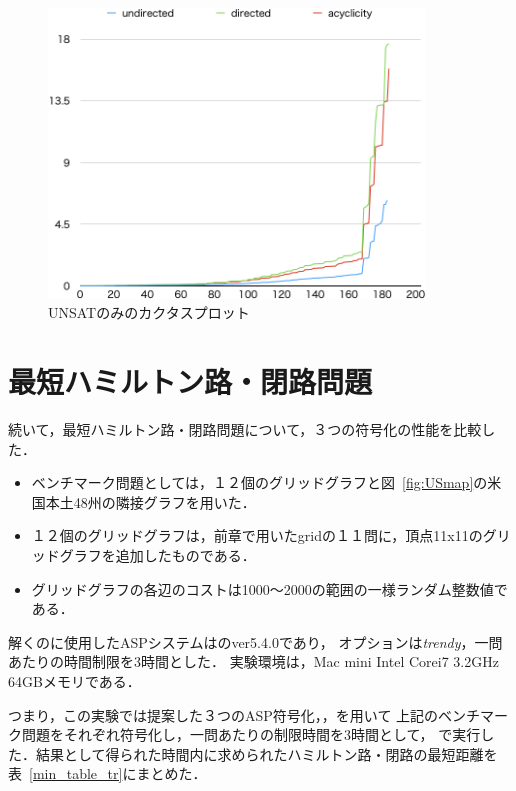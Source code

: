\begin{figure}[htbp]
\begin{center}
  \includegraphics[width=10cm]{fig/cactusunsat.png}
\caption{UNSATのみのカクタスプロット}
\label{cactusunsat}
\end{center}
\end{figure}
\newpage
\section{最短ハミルトン路・閉路問題}
続いて，最短ハミルトン路・閉路問題について，３つの符号化の性能を比較した．

\begin{itemize}
\item ベンチマーク問題としては，１２個のグリッドグラフと図~\ref{fig:USmap}の米国本土48州の隣接グラフを用いた．
\item １２個のグリッドグラフは，前章で用いたgridの１１問に，頂点11x11のグリッドグラフを追加したものである．
\item グリッドグラフの各辺のコストは1000〜2000の範囲の一様ランダム整数値である．
\end{itemize}

解くのに使用したASPシステムは{\clingo}のver5.4.0であり，
オプションは\textit{trendy}，一問あたりの時間制限を3時間とした．
実験環境は，Mac mini Intel Corei7 3.2GHz 64GBメモリである．

つまり，この実験では提案した３つのASP符号化，，を用いて
上記のベンチマーク問題をそれぞれ符号化し，一問あたりの制限時間を3時間として，
{\clingo}で実行した．結果として得られた時間内に求められたハミルトン路・閉路の最短距離を表~\ref{min_table_tr}にまとめた．

